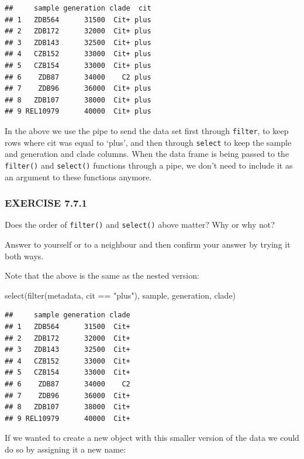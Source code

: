 \documentclass[
]{book}
\newenvironment{Shaded}{\begin{snugshade}}{\end{snugshade}}
\newcommand{\FunctionTok}[1]{\textcolor[rgb]{0.00,0.00,0.00}{#1}}
\newcommand{\NormalTok}[1]{#1}
\newcommand{\SpecialCharTok}[1]{\textcolor[rgb]{0.00,0.00,0.00}{#1}}
\newcommand{\StringTok}[1]{\textcolor[rgb]{0.31,0.60,0.02}{#1}}
\begin{document}
\begin{verbatim}
##     sample generation clade  cit
## 1   ZDB564      31500  Cit+ plus
## 2   ZDB172      32000  Cit+ plus
## 3   ZDB143      32500  Cit+ plus
## 4   CZB152      33000  Cit+ plus
## 5   CZB154      33000  Cit+ plus
## 6    ZDB87      34000    C2 plus
## 7    ZDB96      36000  Cit+ plus
## 8   ZDB107      38000  Cit+ plus
## 9 REL10979      40000  Cit+ plus
\end{verbatim}

In the above we use the pipe to send the data set first through \texttt{filter}, to keep rows where cit was equal to `plus', and then through \texttt{select} to keep the sample and generation and clade columns. When the data frame is being passed to the \texttt{filter()} and \texttt{select()} functions through a pipe, we don't need to include it as an argument to these functions anymore.

\hypertarget{exercise-7.7.1}{%
\subsubsection*{EXERCISE 7.7.1}\label{exercise-7.7.1}}

Does the order of \texttt{filter()} and \texttt{select()} above matter? Why or why not?

Answer to yourself or to a neighbour and then confirm your answer by trying it both ways.

Note that the above is the same as the nested version:

\begin{Shaded}
\begin{Highlighting}[]
\FunctionTok{select}\NormalTok{(}\FunctionTok{filter}\NormalTok{(metadata, cit }\SpecialCharTok{==} \StringTok{"plus"}\NormalTok{), sample, generation, clade)}
\end{Highlighting}
\end{Shaded}

\begin{verbatim}
##     sample generation clade
## 1   ZDB564      31500  Cit+
## 2   ZDB172      32000  Cit+
## 3   ZDB143      32500  Cit+
## 4   CZB152      33000  Cit+
## 5   CZB154      33000  Cit+
## 6    ZDB87      34000    C2
## 7    ZDB96      36000  Cit+
## 8   ZDB107      38000  Cit+
## 9 REL10979      40000  Cit+
\end{verbatim}

If we wanted to create a new object with this smaller version of the data we could do so by assigning it a new name:
\end{document}
